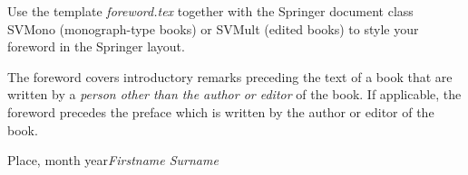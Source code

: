 %
%

\foreword

Use the template \textit{foreword.tex} together with the Springer document class SVMono (monograph-type books) or SVMult (edited books) to style your foreword in the Springer layout. 

The foreword covers introductory remarks preceding the text of a book that are written by a \textit{person other than the author or editor} of the book. If applicable, the foreword precedes the preface which is written by the author or editor of the book.


\vspace{\baselineskip}
\begin{flushright}\noindent
Place, month year\hfill {\it Firstname  Surname}\\
\end{flushright}


